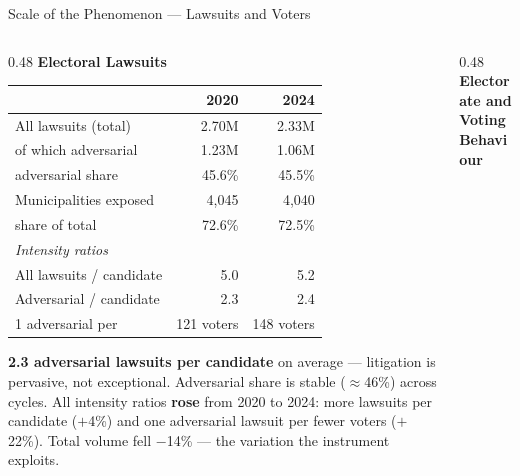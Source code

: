 \documentclass[aspectratio=169,10pt]{beamer}
\begin{document}
\begin{frame}{Scale of the Phenomenon --- Lawsuits and Voters}
\begin{columns}[T]

\begin{column}{0.48\textwidth}
\textbf{Electoral Lawsuits}
\vspace{2pt}

\footnotesize
\renewcommand{\arraystretch}{1.1}
\begin{tabular}{lrr}
  \toprule
  & 2020 & 2024 \\
  \midrule
  All lawsuits (total)        & 2.70M & 2.33M \\
  \quad of which adversarial  & 1.23M & 1.06M \\
  \quad adversarial share     & 45.6\% & 45.5\% \\
  Municipalities exposed      & 4,045 & 4,040 \\
  \quad share of total        & 72.6\% & 72.5\% \\
  \multicolumn{3}{l}{\textit{Intensity ratios}} \\
  All lawsuits / candidate    & 5.0 & 5.2 \\
  Adversarial / candidate     & 2.3 & 2.4 \\
  1 adversarial per            & 121 voters & 148 voters \\
  \bottomrule
\end{tabular}

\vspace{4pt}
\begin{alertblock}{}
  \footnotesize
  \textbf{2.3 adversarial lawsuits per candidate} on average --- litigation is pervasive, not exceptional. Adversarial share is stable ($\approx$46\%) across cycles. All intensity ratios \textbf{rose} from 2020 to 2024: more lawsuits per candidate ($+$4\%) and one adversarial lawsuit per fewer voters ($+$22\%). Total volume fell $-$14\% --- the variation the instrument exploits.
\end{alertblock}
\end{column}

\begin{column}{0.48\textwidth}
\textbf{Electorate and Voting Behaviour}
\vspace{2pt}


\end{column}
\end{columns}
\end{frame}
\end{document}
